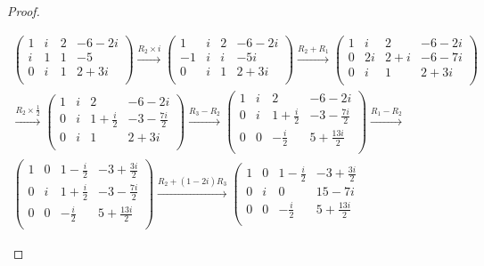 \begin{proof}
\begin{parts}
			\begin{gather*}
			\left(
\begin{array}{ccc|c}
 1 & i & 2 & -6-2 i \\
 i & 1 & 1 & -5 \\
 0 & i & 1 & 2+3 i \\
\end{array}
\right) \xrightarrow{R_2\times i} \left(
\begin{array}{ccc|c}
 1 & i & 2 & -6-2 i \\
 -1 & i & i & -5 i \\
 0 & i & 1 & 2+3 i \\
\end{array}
\right) \xrightarrow{R_2+R_1} \left(
\begin{array}{ccc|c}
 1 & i & 2 & -6-2 i \\
 0 & 2 i & 2+i & -6-7 i \\
 0 & i & 1 & 2+3 i \\
\end{array}
\right)\\ \xrightarrow{R_2\times \frac{1}{2}} \left(
\begin{array}{ccc|c}
 1 & i & 2 & -6-2 i \\
 0 & i & 1+\frac{i}{2} & -3-\frac{7 i}{2} \\
 0 & i & 1 & 2+3 i \\
\end{array}
\right) \xrightarrow{R_3-R_2} \left(
\begin{array}{ccc|c}
 1 & i & 2 & -6-2 i \\
 0 & i & 1+\frac{i}{2} & -3-\frac{7 i}{2} \\
 0 & 0 & -\frac{i}{2} & 5+\frac{13 i}{2} \\
\end{array}
\right) \xrightarrow{R_1-R_2}\\ \left(
\begin{array}{ccc|c}
 1 & 0 & 1-\frac{i}{2} & -3+\frac{3 i}{2} \\
 0 & i & 1+\frac{i}{2} & -3-\frac{7 i}{2} \\
 0 & 0 & -\frac{i}{2} & 5+\frac{13 i}{2} \\
\end{array}
\right) \xrightarrow{R_2+(1-2i)R_3} \left(
\begin{array}{ccc|c}
 1 & 0 & 1-\frac{i}{2} & -3+\frac{3 i}{2} \\
 0 & i & 0 & 15-7 i \\
 0 & 0 & -\frac{i}{2} & 5+\frac{13 i}{2} \\

\end{array}
\end{gather*}
\end{parts}
\end{proof}
